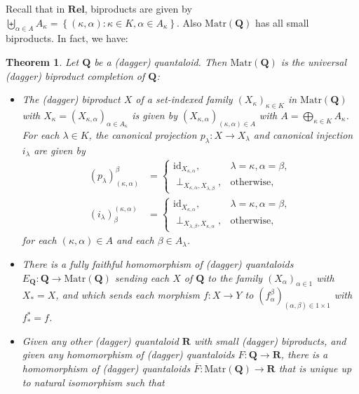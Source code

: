 \documentclass[12pt]{tac}
\newtheorem{theorem}{Theorem}[section]
\theoremstyle{definition}
\theoremstyle{remark}
\newcommand{\<}{\langle}
\renewcommand{\>}{\rangle}
\renewcommand{\:}{\colon}
\newcommand{\id}{\mathrm{id}}
\begin{document}
Recall that in $\mathbf{Rel}$, biproducts are given by $\biguplus_{\alpha\in A}A_\kappa=\left\{(\kappa,\alpha):\kappa\in K,\alpha\in A_\kappa\right\}$. Also $\mathrm{Matr}(\mathbf Q)$ has all small biproducts. In fact, we have:

\begin{theorem}\label{thm:biproduct-completion}\cite[p.43]{Stubbe}
    Let $\mathbf Q$ be a (dagger) quantaloid. Then $\mathrm{Matr}(\mathbf Q)$ is the universal (dagger) biproduct completion of $\mathbf Q$:
    \begin{itemize}
    \item The (dagger) biproduct $X$ of a set-indexed family $(X_\kappa)_{\kappa\in K}$ in $\mathrm{Matr}(\mathbf Q)$ with $X_\kappa=(X_{\kappa,\alpha})_{\alpha\in A_\kappa}$ is given by $(X_{\kappa,\alpha})_{(\kappa,\alpha)\in A}$ with $A=\bigoplus_{\kappa\in K}A_\kappa$. For each $\lambda\in K$, the canonical projection $p_\lambda:X\to X_\lambda$ and canonical injection $i_\lambda$ are given by 
\begin{align*}
    (p_\lambda)_{(\kappa,\alpha)}^\beta & = \begin{cases} \id_{X_{\kappa,\alpha}}, & \lambda=\kappa,\alpha=\beta,\\
    \perp_{X_{\kappa,\alpha},X_{\lambda,\beta}}, & \text{otherwise},
    \end{cases}
    \\
    (i_\lambda)_\beta^{(\kappa,\alpha)} & = \begin{cases} \id_{X_{\kappa,\alpha}}, & \lambda=\kappa,\alpha=\beta,\\
    \perp_{X_{\lambda,\beta},X_{\kappa,\alpha}}, & \text{otherwise},
    \end{cases}
\end{align*}
    for each $(\kappa,\alpha)\in A$ and each $\beta\in A_\lambda$. 
    \item There is a fully faithful homomorphism of (dagger) quantaloids $E_\mathbf Q:\mathbf Q\to\mathrm{Matr}(\mathbf Q)$ sending each $X$ of $\mathbf Q$ to the family $(X_\alpha)_{\alpha\in 1}$ with $X_*=X$, and which sends each morphism $f:X\to Y$ to $(f_\alpha^\beta)_{(\alpha,\beta)\in 1\times 1}$ with $f_*^*=f$. 
    \item Given any other (dagger) quantaloid $\mathbf R$ with small (dagger) biproducts, and given any homomorphism of (dagger) quantaloids $F:\mathbf Q\to\mathbf R$, there is a  homomorphism of (dagger) quantaloids $\overline F:\mathrm{Matr}(\mathbf Q)\to\mathbf R$ that is unique up to natural isomorphism such that

\end{itemize}
\end{theorem}
\end{document}
